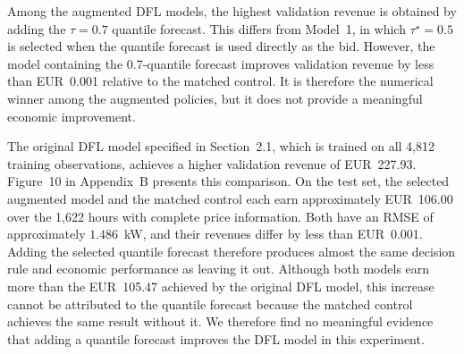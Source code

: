 Among the augmented DFL models, the highest validation revenue is obtained by adding the $\tau=0.7$ quantile forecast. This differs from Model~1, in which $\tau^\star=0.5$ is selected when the quantile forecast is used directly as the bid. However, the model containing the $0.7$-quantile forecast improves validation revenue by less than EUR~0.001 relative to the matched control. It is therefore the numerical winner among the augmented policies, but it does not provide a meaningful economic improvement. 

The original DFL model specified in Section~2.1, which is trained on all 4,812 training observations, achieves a higher validation revenue of EUR~227.93. Figure~10 in Appendix~B presents this comparison. On the test set, the selected augmented model and the matched control each earn approximately EUR~106.00 over the 1,622 hours with complete price information. Both have an RMSE of approximately $1.486$~kW, and their revenues differ by less than EUR~0.001. Adding the selected quantile forecast therefore produces almost the same decision rule and economic performance as leaving it out. Although both models earn more than the EUR~105.47 achieved by the original DFL model, this increase cannot be attributed to the quantile forecast because the matched control achieves the same result without it. We therefore find no meaningful evidence that adding a quantile forecast improves the DFL model in this experiment.
